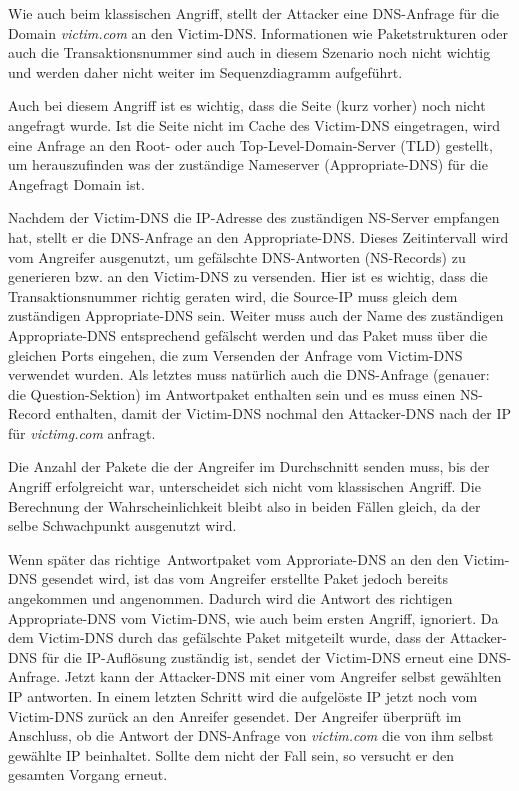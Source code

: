 \documentclass[10pt,a4paper]{article}
\begin{document}
Wie auch beim klassischen Angriff, stellt der Attacker eine DNS-Anfrage für die Domain \emph{victim.com} an den Victim-DNS. Informationen wie Paketstrukturen oder auch die Transaktionsnummer sind auch in diesem Szenario noch nicht wichtig und werden daher nicht weiter im Sequenzdiagramm aufgeführt.

Auch bei diesem Angriff ist es wichtig, dass die Seite (kurz vorher) noch nicht angefragt wurde. Ist die Seite nicht im Cache des Victim-DNS eingetragen, wird eine Anfrage an den Root- oder auch Top-Level-Domain-Server (TLD) gestellt, um herauszufinden was der zuständige Nameserver (Appropriate-DNS) für die Angefragt Domain ist.

Nachdem der Victim-DNS die IP-Adresse des zuständigen NS-Server empfangen hat, stellt er die DNS-Anfrage an den Appropriate-DNS. Dieses Zeitintervall wird vom Angreifer ausgenutzt, um gefälschte DNS-Antworten (NS-Records) zu generieren bzw. an den Victim-DNS zu versenden. Hier ist es wichtig, dass die Transaktionsnummer richtig geraten wird, die Source-IP muss gleich dem zuständigen Appropriate-DNS sein. Weiter muss auch der Name des zuständigen Appropriate-DNS entsprechend gefälscht werden und das Paket muss über die gleichen Ports eingehen, die zum Versenden der Anfrage vom Victim-DNS verwendet wurden. Als letztes muss natürlich auch die DNS-Anfrage (genauer: die Question-Sektion) im Antwortpaket enthalten sein und es muss einen NS-Record enthalten, damit der Victim-DNS nochmal den Attacker-DNS nach der IP für \emph{victimg.com} anfragt.

Die Anzahl der Pakete die der Angreifer im Durchschnitt senden muss, bis der Angriff erfolgreicht war, unterscheidet sich nicht vom klassischen Angriff. Die Berechnung der Wahrscheinlichkeit bleibt also in beiden Fällen gleich, da der selbe Schwachpunkt ausgenutzt wird.

Wenn später das \glqq richtige\grqq\ Antwortpaket vom Approriate-DNS an den den Victim-DNS gesendet wird, ist das vom Angreifer erstellte Paket jedoch bereits angekommen und angenommen. Dadurch wird die Antwort des richtigen Appropriate-DNS vom Victim-DNS, wie auch beim ersten Angriff, ignoriert. Da dem Victim-DNS durch das gefälschte Paket mitgeteilt wurde, dass der Attacker-DNS für die IP-Auflösung zuständig ist, sendet der Victim-DNS erneut eine DNS-Anfrage. Jetzt kann der Attacker-DNS mit einer vom Angreifer selbst gewählten IP antworten. In einem letzten Schritt wird die aufgelöste IP jetzt noch vom Victim-DNS zurück an den Anreifer gesendet. Der Angreifer überprüft im Anschluss, ob die Antwort der DNS-Anfrage von \emph{victim.com} die von ihm selbst gewählte IP beinhaltet. Sollte dem nicht der Fall sein, so versucht er den gesamten Vorgang erneut.
\end{document}
